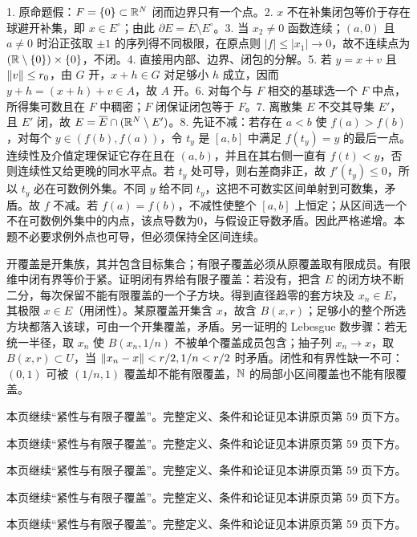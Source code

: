 1. 原命题假：$F=\{0\}\subset\mathbb{R}^N$ 闭而边界只有一个点。2. $x$ 不在补集闭包等价于存在球避开补集，即 $x\in E^\circ$；由此 $\partial E=\overline E\setminus E^\circ$。3. 当 $x_2\ne0$ 函数连续；$(a,0)$ 且 $a\ne0$ 时沿正弦取 $\pm1$ 的序列得不同极限，在原点则 $|f|\le|x_1|\to0$，故不连续点为 $(\mathbb{R}\setminus\{0\})\times\{0\}$，不闭。4. 直接用内部、边界、闭包的分解。5. 若 $y=x+v$ 且 $\left\lVert v\right\rVert\le r_0$，由 $G$ 开，$x+h\in G$ 对足够小 $h$ 成立，因而 $y+h=(x+h)+v\in A$，故 $A$ 开。6. 对每个与 $F$ 相交的基球选一个 $F$ 中点，所得集可数且在 $F$ 中稠密；$F$ 闭保证闭包等于 $F$。7. 离散集 $E$ 不交其导集 $E'$，且 $E'$ 闭，故 $E=\overline E\cap(\mathbb{R}^N\setminus E')$。8. 先证不减：若存在 $a<b$ 使 $f(a)>f(b)$，对每个 $y\in(f(b),f(a))$，令 $t_y$ 是 $[a,b]$ 中满足 $f(t_y)=y$ 的最后一点。连续性及介值定理保证它存在且在 $(a,b)$，并且在其右侧一直有 $f(t)<y$，否则连续性又给更晚的同水平点。若 $t_y$ 处可导，则右差商非正，故 $f'(t_y)\le0$，所以 $t_y$ 必在可数例外集。不同 $y$ 给不同 $t_y$，这把不可数实区间单射到可数集，矛盾。故 $f$ 不减。若 $f(a)=f(b)$，不减性使整个 $[a,b]$ 上恒定；从区间选一个不在可数例外集中的内点，该点导数为0，与假设正导数矛盾。因此严格递增。本题不必要求例外点也可导，但必须保持全区间连续。

开覆盖是开集族，其并包含目标集合；有限子覆盖必须从原覆盖取有限成员。有限维中闭有界等价于紧。证明闭有界给有限子覆盖：若没有，把含 $E$ 的闭方块不断二分，每次保留不能有限覆盖的一个子方块。得到直径趋零的套方块及 $x_n\in E$，其极限 $x\in E$（用闭性）。某原覆盖开集含 $x$，故含 $B(x,r)$；足够小的整个所选方块都落入该球，可由一个开集覆盖，矛盾。另一证明的 Lebesgue 数步骤：若无统一半径，取 $x_n$ 使 $B(x_n,1/n)$ 不被单个覆盖成员包含；抽子列 $x_n\to x$，取 $B(x,r)\subset U$，当 $\left\lVert x_n-x\right\rVert<r/2,1/n<r/2$ 时矛盾。闭性和有界性缺一不可：$(0,1)$ 可被 $(1/n,1)$ 覆盖却不能有限覆盖，$\mathbb{N}$ 的局部小区间覆盖也不能有限覆盖。

本页继续“紧性与有限子覆盖”。完整定义、条件和论证见本讲原页第 59 页下方。

本页继续“紧性与有限子覆盖”。完整定义、条件和论证见本讲原页第 59 页下方。

本页继续“紧性与有限子覆盖”。完整定义、条件和论证见本讲原页第 59 页下方。

本页继续“紧性与有限子覆盖”。完整定义、条件和论证见本讲原页第 59 页下方。

本页继续“紧性与有限子覆盖”。完整定义、条件和论证见本讲原页第 59 页下方。

